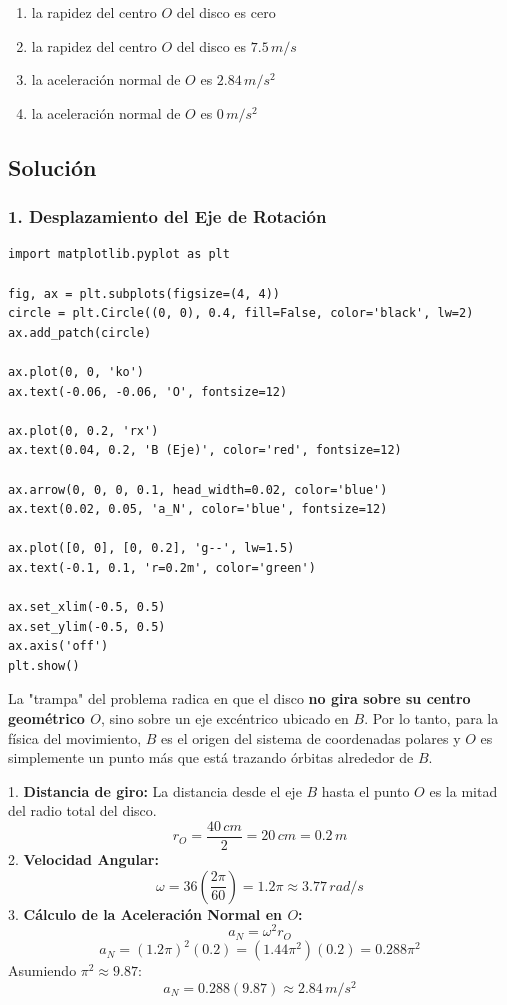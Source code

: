\documentclass[12pt, a4paper]{article}
\begin{document}
\begin{enumerate}[label=\alph*)]
    \item la rapidez del centro $O$ del disco es cero
    \item la rapidez del centro $O$ del disco es $7.5\,\si{m/s}$
    \item la aceleración normal de $O$ es $2.84\,\si{m/s^2}$
    \item la aceleración normal de $O$ es $0\,\si{m/s^2}$
\end{enumerate}

\subsection*{Solución}

\subsubsection*{1. Desplazamiento del Eje de Rotación}

\begin{verbatim}
import matplotlib.pyplot as plt

fig, ax = plt.subplots(figsize=(4, 4))
circle = plt.Circle((0, 0), 0.4, fill=False, color='black', lw=2)
ax.add_patch(circle)

ax.plot(0, 0, 'ko')
ax.text(-0.06, -0.06, 'O', fontsize=12)

ax.plot(0, 0.2, 'rx')
ax.text(0.04, 0.2, 'B (Eje)', color='red', fontsize=12)

ax.arrow(0, 0, 0, 0.1, head_width=0.02, color='blue')
ax.text(0.02, 0.05, 'a_N', color='blue', fontsize=12)

ax.plot([0, 0], [0, 0.2], 'g--', lw=1.5)
ax.text(-0.1, 0.1, 'r=0.2m', color='green')

ax.set_xlim(-0.5, 0.5)
ax.set_ylim(-0.5, 0.5)
ax.axis('off')
plt.show()
\end{verbatim}

La "trampa" del problema radica en que el disco \textbf{no gira sobre su centro geométrico $O$}, sino sobre un eje excéntrico ubicado en $B$. Por lo tanto, para la física del movimiento, $B$ es el origen del sistema de coordenadas polares y $O$ es simplemente un punto más que está trazando órbitas alrededor de $B$.

1. \textbf{Distancia de giro:} La distancia desde el eje $B$ hasta el punto $O$ es la mitad del radio total del disco.
$$ r_O = \frac{40\,\si{cm}}{2} = 20\,\si{cm} = 0.2\,\si{m} $$
2. \textbf{Velocidad Angular:}
$$ \omega = 36 \left( \frac{2\pi}{60} \right) = 1.2\pi \approx 3.77\,\si{rad/s} $$
3. \textbf{Cálculo de la Aceleración Normal en $O$:}
$$ a_N = \omega^2 r_O $$
$$ a_N = (1.2\pi)^2 (0.2) = (1.44\pi^2)(0.2) = 0.288\pi^2 $$
Asumiendo $\pi^2 \approx 9.87$:
$$ a_N = 0.288 (9.87) \approx 2.84\,\si{m/s^2} $$
\end{document}
